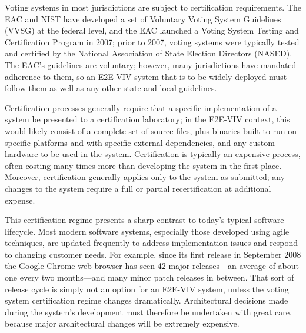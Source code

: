 
Voting systems in most jurisdictions are subject to certification
requirements. The EAC and NIST have developed a set of Voluntary
Voting System Guidelines (VVSG) at the federal level, and the EAC
launched a Voting System Testing and Certification Program in 2007;
prior to 2007, voting systems were typically tested and certified by
the National Association of State Election Directors (NASED). The
EAC's guidelines are voluntary; however, many jurisdictions have
mandated adherence to them, so an E2E-VIV system that is to be widely
deployed must follow them as well as any other state and local
guidelines.

Certification processes generally require that a specific
implementation of a system be presented to a certification laboratory;
in the E2E-VIV context, this would likely consist of a complete set of
source files, plus binaries built to run on specific platforms and
with specific external dependencies, and any custom hardware to be
used in the system. Certification is typically an expensive process,
often costing many times more than developing the system in the first
place. Moreover, certification generally applies only to the system as
submitted; any changes to the system require a full or partial
recertification at additional expense.

This certification regime presents a sharp contrast to today's typical
software lifecycle. Most modern software systems, especially those
developed using agile techniques, are updated frequently to address
implementation issues and respond to changing customer needs. For
example, since its first release in September 2008 the Google Chrome
web browser has seen 42 major releases---an average of about one every
two months---and many minor patch releases in between. That sort of
release cycle is simply not an option for an E2E-VIV system, unless the
voting system certification regime changes dramatically.
Architectural decisions made during the system's development must
therefore be undertaken with great care, because major architectural
changes will be extremely expensive.


